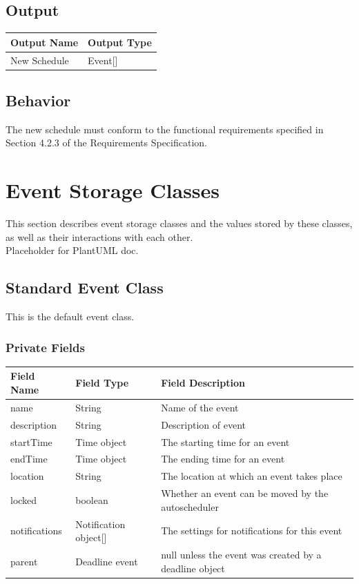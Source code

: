 \documentclass{scrreprt}
\begin{document}
\section{Output}
\begin{center}
\begin{longtable}{ | p{5cm} | p{9cm} | }
\hline
\textbf{Output Name} & \textbf{Output Type}\\
\hline
New Schedule & Event[] \\
\hline
\end{longtable}
\end{center}

\section{Behavior}
The new schedule must conform to the functional requirements specified in Section 4.2.3 of the Requirements Specification.


\chapter{Event Storage Classes}

This section describes event storage classes and the values stored by these classes, as well as their interactions with each other.\\

Placeholder for PlantUML doc.

\section{Standard Event Class}

This is the default event class.

\subsection{Private Fields}

\begin{center}
\begin{longtable}{ | p{3cm} | p{6cm} | p{6cm} | }
\hline
\textbf{Field Name} & \textbf{Field Type} & \textbf{Field Description} \\
\hline
name & String & Name of the event \\
\hline
description & String & Description of event \\
\hline
startTime & Time object & The starting time for an event \\
\hline
endTime & Time object & The ending time for an event \\
\hline
location & String & The location at which an event takes place \\
\hline
locked & boolean & Whether an event can be moved by the autoscheduler \\
\hline
notifications & Notification object[] & The settings for notifications for this event \\
\hline
parent & Deadline event & null unless the event was created by a deadline object \\
\hline
\end{longtable}
\end{center}
\end{document}
